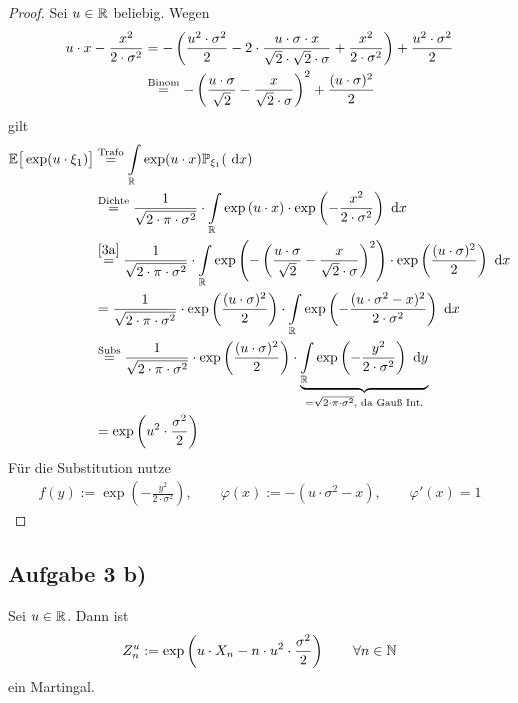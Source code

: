 \documentclass[12pt,a4paper]{article}
\begin{document}
\begin{proof}
Sei $u\in\mathbb{R}$ beliebig. Wegen
\begin{align}\label{3a}
u\cdot x-\frac{x^2}{2\cdot\sigma^2}
&=-\left(\frac{u^2\cdot\sigma^2}{2}-2\cdot\frac{u\cdot\sigma\cdot x}{\sqrt{2}\cdot\sqrt{2}\cdot\sigma}+\frac{x^2}{2\cdot\sigma^2}\right)+\frac{u^2\cdot\sigma^2}{2}\\\nonumber
&\stackrel{\text{Binom}}{=}
-\left(\frac{u\cdot\sigma}{\sqrt{2}}-\frac{x}{\sqrt{2}\cdot\sigma}\right)^2+\frac{(u\cdot\sigma)^2}{2}
\end{align}
gilt
\begin{align*}
\mathbb{E}\big[\exp(u\cdot\xi_1)\big]
&\stackrel{\text{Trafo}}{=}
\int\limits_{\mathbb{R}}\exp(u\cdot x)\mathbb{P}_{\xi_1}(\text{ d} x)\\
&\stackrel{\text{Dichte}}{=}
\frac{1}{\sqrt{2\cdot\pi\cdot\sigma^2}}\cdot\int\limits_{\mathbb{R}} \exp\left(u\cdot x\right)\cdot \exp\left(-\frac{x^2}{2\cdot\sigma^2}\right)\text{ d} x\\
&\stackrel{\eqref{3a}}{=}
\frac{1}{\sqrt{2\cdot\pi\cdot\sigma^2}}\cdot\int\limits_{\mathbb{R}} \exp\left(-\left(\frac{u\cdot\sigma}{\sqrt{2}}-\frac{x}{\sqrt{2}\cdot\sigma}\right)^2\right) \cdot\exp\left(\frac{(u\cdot\sigma)^2}{2}\right)\text{ d} x\\
&=\frac{1}{\sqrt{2\cdot\pi\cdot\sigma^2}} \cdot \exp\left(\frac{(u\cdot\sigma)^2}{2}\right)\cdot\int\limits_{\mathbb{R}} \exp\left(-\frac{(u\cdot\sigma^2-x)^2}{2\cdot\sigma^2}\right)\text{ d} x\\
&\stackrel{\text{Subs}}{=}
\frac{1}{\sqrt{2\cdot\pi\cdot\sigma^2}}\cdot\exp\left(\frac{(u\cdot\sigma)^2}{2}\right)\cdot\underbrace{\int\limits_{\mathbb{R}} \exp\left(-\frac{y^2}{2\cdot\sigma^2}\right)\text{ d} y}_{=\sqrt{2\cdot\pi\cdot\sigma^2}\text{, da Gauß Int.}}\\
&=\exp\left(u^2\cdot\frac{\sigma^2}{2}\right)
\end{align*}
Für die Substitution nutze
\begin{align*}
f(y):=\exp\left(-\frac{y^2}{2\cdot\sigma^2}\right),\qquad\varphi(x):=-(u\cdot\sigma^2-x),\qquad\varphi'(x)=1
\end{align*}
\end{proof}

\subsection*{Aufgabe 3 b)}
Sei $u\in\mathbb{R}$. Dann ist
\begin{align*}
Z_n^u:=\exp\left(u\cdot X_n-n\cdot u^2\cdot\frac{\sigma^2}{2}\right)\qquad\forall n\in\mathbb{N}
\end{align*}
ein Martingal.
\end{document}
